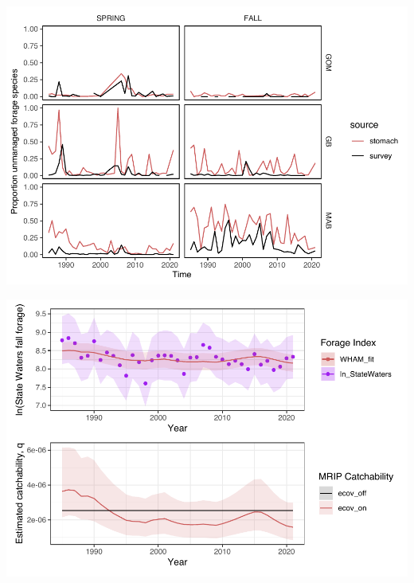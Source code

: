 \documentclass[
]{article}
\let\origfigure\figure
\let\endorigfigure\endfigure
\renewenvironment{figure}[1][2] {
    \expandafter\origfigure\expandafter[H]
} {
    \endorigfigure
}
\begin{document}
\begin{figure}
\centering
\includegraphics{Bluefish_forageindex_CJFAS_files/figure-latex/unmanagedprop-1.pdf}
\caption{\label{fig:unmanagedprop}Proportion of unmanaged forage species in stomach contents data (red) compared with survey biomass sampling (black) over time by region and season.}
\end{figure}

\begin{figure}
\centering
\includegraphics{Bluefish_forageindex_CJFAS_files/figure-latex/WHAMq-1.pdf}
\caption{\label{fig:WHAMq}Fall state waters forage index fit as a catchabilty covariate within the bluefish assessment model (top), with resulting catchability, q, for the recreational fishery catch per unit effort (MRIP) index (bottom).}
\end{figure}
\end{document}
